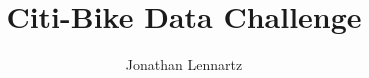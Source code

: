 \documentclass[aspectratio=169,xcolor={usenames,dvipsnames,svgnames,table},10pt,usepdftitle=false,hyperref={bookmarksdepth=3}]{beamer}
\title{Citi-Bike Data Challenge}
\author[Jonathan Lennartz]{Jonathan Lennartz}
\institute[University of Bonn]{

\begin{textblock*}{8cm}(7cm,6cm) %

    \vspace*{0.1cm}
    \begin{figure}[b]
        \hfill
        \texttt{[image: ../assets/axa\_logo.png]}
    \end{figure}

\end{textblock*}}
\begin{document}
\maketitle



\begin{frame}[standout]

\end{frame}
\end{document}
